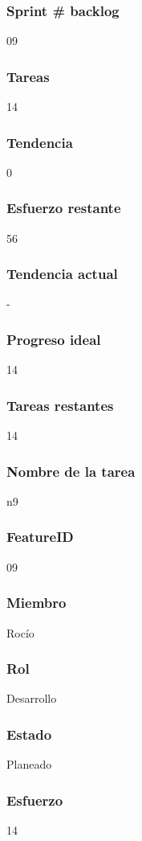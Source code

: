 \subsubsection{Sprint # backlog}
09

\subsubsection{Tareas}
14
\subsubsection{Tendencia}
0
\subsubsection{Esfuerzo restante}
56
\subsubsection{Tendencia actual}
-
\subsubsection{Progreso ideal}
14
\subsubsection{Tareas restantes}
14
\subsubsection{Nombre de la tarea}
n9
\subsubsection{FeatureID}
09
\subsubsection{Miembro}
Rocío
\subsubsection{Rol}
Desarrollo
\subsubsection{Estado}
Planeado
\subsubsection{Esfuerzo}
14





